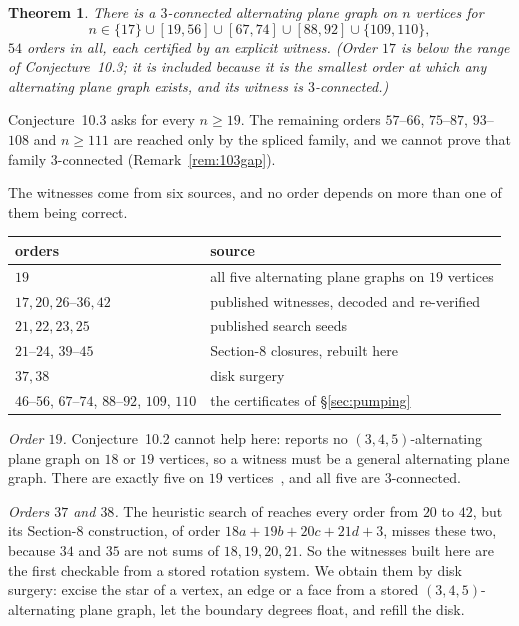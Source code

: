 \documentclass[11pt,a4paper]{amsart}
\theoremstyle{plain}
\newtheorem{theorem}{Theorem}[section]
\theoremstyle{definition}
\begin{document}
\begin{theorem}\label{thm:103}
There is a $3$-connected alternating plane graph on $n$ vertices for
$$n \in \{17\} \cup [19,56] \cup [67,74] \cup [88,92] \cup \{109,110\},$$
$54$ orders in all, each certified by an explicit witness. (Order $17$ is
below the range of Conjecture~10.3; it is included because it is the smallest
order at which any alternating plane graph exists, and its witness is
$3$-connected.)
\end{theorem}

Conjecture~10.3 asks for every $n \ge 19$. The remaining orders $57$--$66$,
$75$--$87$, $93$--$108$ and $n \ge 111$ are reached only by the spliced family,
and we cannot prove that family $3$-connected (Remark~\ref{rem:103gap}).

The witnesses come from six sources, and no order depends on more than one of
them being correct.

\begin{center}
\begin{tabular}{ll}
\toprule
orders & source \\
\midrule
$19$ & all five alternating plane graphs on $19$ vertices \\
$17, 20, 26$--$36, 42$ & published witnesses, decoded and re-verified \\
$21, 22, 23, 25$ & published search seeds \\
$21$--$24$, $39$--$45$ & Section-8 closures, rebuilt here \\
$37, 38$ & disk surgery \\
$46$--$56$, $67$--$74$, $88$--$92$, $109$, $110$ & the certificates of \S\ref{sec:pumping} \\
\bottomrule
\end{tabular}
\end{center}

\emph{Order $19$.} Conjecture~10.2 cannot help here: \cite{AHSSV2015} reports
no $(3,4,5)$-alternating plane graph on $18$ or $19$ vertices, so a witness must
be a general alternating plane graph. There are exactly five on
$19$ vertices~\cite{HoG}, and all five are $3$-connected.

\emph{Orders $37$ and $38$.} The heuristic search of \cite{AHSSV2015} reaches
every order from $20$ to $42$, but its Section-8 construction, of order
$18a+19b+20c+21d+3$, misses these two, because $34$ and $35$ are not sums of
$18,19,20,21$. So the witnesses built here are the first checkable from a stored
rotation system. We obtain them by disk surgery: excise the star of a vertex, an
edge or a face from a stored $(3,4,5)$-alternating plane graph, let the boundary
degrees float, and refill the disk.
\end{document}
